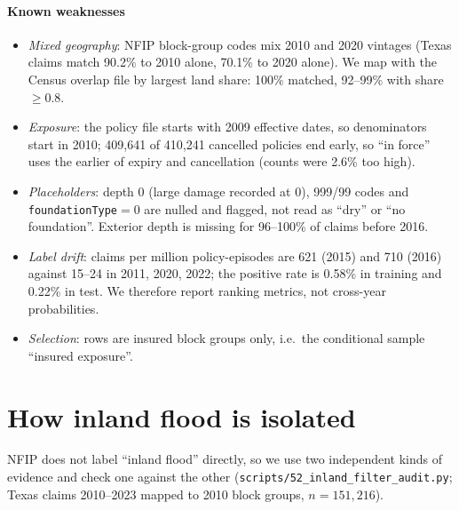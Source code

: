 \documentclass[11pt]{article}
\newcommand{\tc}[1]{\texttt{#1}}
\begin{document}
\paragraph{Known weaknesses}
\begin{itemize}
  \item \emph{Mixed geography}: NFIP block-group codes mix 2010 and 2020 vintages (Texas claims match 90.2\% to 2010 alone, 70.1\% to 2020 alone). We map with the Census overlap file by largest land share: 100\% matched, 92--99\% with share $\ge0.8$.
  \item \emph{Exposure}: the policy file starts with 2009 effective dates, so denominators start in 2010; 409,641 of 410,241 cancelled policies end early, so ``in force'' uses the earlier of expiry and cancellation (counts were 2.6\% too high).
  \item \emph{Placeholders}: depth 0 (large damage recorded at 0), 999/99 codes and \tc{foundationType}$=0$ are nulled and flagged, not read as ``dry'' or ``no foundation''. Exterior depth is missing for 96--100\% of claims before 2016.
  \item \emph{Label drift}: claims per million policy-episodes are 621 (2015) and 710 (2016) against 15--24 in 2011, 2020, 2022; the positive rate is 0.58\% in training and 0.22\% in test. We therefore report ranking metrics, not cross-year probabilities.
  \item \emph{Selection}: rows are insured block groups only, i.e.\ the conditional sample ``insured exposure''.
\end{itemize}


\section{How inland flood is isolated}

NFIP does not label ``inland flood'' directly, so we use two independent kinds of evidence and check one against the other (\tc{scripts/52\_inland\_filter\_audit.py}; Texas claims 2010--2023 mapped to 2010 block groups, $n=151{,}216$).
\end{document}
